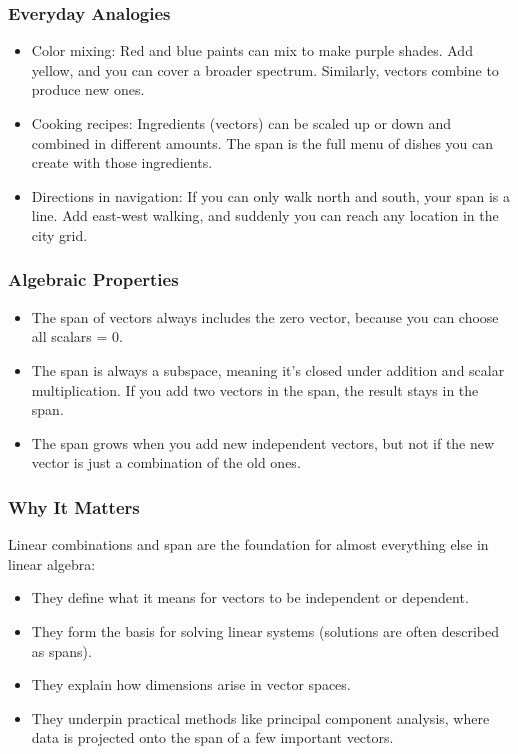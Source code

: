 \documentclass[
  letterpaper,
  DIV=11,
  numbers=noendperiod]{scrreprt}
\providecommand{\tightlist}{%
  \setlength{\itemsep}{0pt}\setlength{\parskip}{0pt}}
\begin{document}
\subsubsection{Everyday Analogies}\label{everyday-analogies-1}

\begin{itemize}
\tightlist
\item
  Color mixing: Red and blue paints can mix to make purple shades. Add
  yellow, and you can cover a broader spectrum. Similarly, vectors
  combine to produce new ones.
\item
  Cooking recipes: Ingredients (vectors) can be scaled up or down and
  combined in different amounts. The span is the full menu of dishes you
  can create with those ingredients.
\item
  Directions in navigation: If you can only walk north and south, your
  span is a line. Add east-west walking, and suddenly you can reach any
  location in the city grid.
\end{itemize}

\subsubsection{Algebraic Properties}\label{algebraic-properties-1}

\begin{itemize}
\tightlist
\item
  The span of vectors always includes the zero vector, because you can
  choose all scalars = 0.
\item
  The span is always a subspace, meaning it's closed under addition and
  scalar multiplication. If you add two vectors in the span, the result
  stays in the span.
\item
  The span grows when you add new independent vectors, but not if the
  new vector is just a combination of the old ones.
\end{itemize}

\subsubsection{Why It Matters}\label{why-it-matters-3}

Linear combinations and span are the foundation for almost everything
else in linear algebra:

\begin{itemize}
\tightlist
\item
  They define what it means for vectors to be independent or dependent.
\item
  They form the basis for solving linear systems (solutions are often
  described as spans).
\item
  They explain how dimensions arise in vector spaces.
\item
  They underpin practical methods like principal component analysis,
  where data is projected onto the span of a few important vectors.
\end{itemize}
\end{document}
